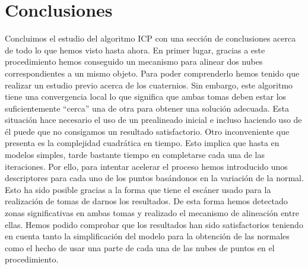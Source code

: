 \section{Conclusiones}
Concluimos el estudio del algoritmo ICP con una sección de conclusiones acerca de todo lo que hemos visto hasta ahora. En primer lugar, gracias a este procedimiento hemos conseguido un  mecanismo para alinear dos nubes correspondientes a un mismo objeto. Para poder comprenderlo hemos tenido que realizar un estudio previo acerca de los cuaternios. Sin embargo, este algoritmo tiene una convergencia local lo que significa que ambas tomas deben estar los suficientemente ``cerca'' una de otra para obtener una solución adecuada. Esta situación hace necesario el uso de un prealineado inicial e incluso haciendo uso de él puede que no consigamos un resultado satisfactorio. Otro inconveniente que presenta es la complejidad cuadrática en tiempo. Esto implica que hasta en modelos simples, tarde bastante tiempo en completarse cada una de las iteraciones. Por ello, para intentar acelerar el proceso hemos introducido unos descriptores para cada uno de los puntos basándonos en la variación de la normal. Esto ha sido posible gracias a la forma que tiene el escáner usado para la realización de tomas de darnos los resultados. De esta forma hemos detectado zonas significativas en ambas tomas  y realizado el mecanismo de alineación entre ellas. Hemos podido comprobar que los resultados han sido satisfactorios teniendo en cuenta tanto la simplificación del modelo para la obtención de las normales como el hecho de usar una parte de cada una de las nubes de puntos en el procedimiento.